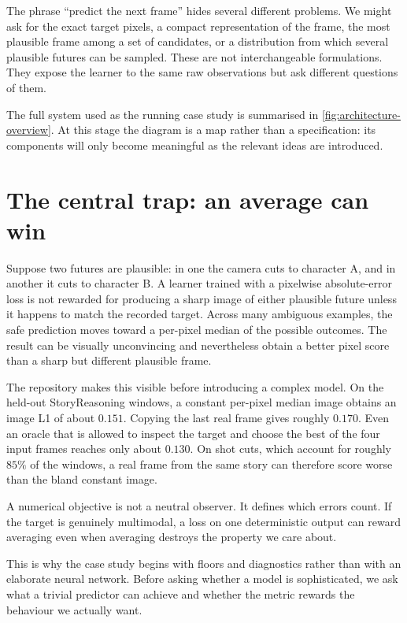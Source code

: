 The phrase ``predict the next frame'' hides several different problems. We might ask for the exact target pixels, a compact representation of the frame, the most plausible frame among a set of candidates, or a distribution from which several plausible futures can be sampled. These are not interchangeable formulations. They expose the learner to the same raw observations but ask different questions of them.

The full system used as the running case study is summarised in \cref{fig:architecture-overview}. At this stage the diagram is a map rather than a specification: its components will only become meaningful as the relevant ideas are introduced.

\section{The central trap: an average can win}

Suppose two futures are plausible: in one the camera cuts to character A, and in another it cuts to character B. A learner trained with a pixelwise absolute-error loss is not rewarded for producing a sharp image of either plausible future unless it happens to match the recorded target. Across many ambiguous examples, the safe prediction moves toward a per-pixel median of the possible outcomes. The result can be visually unconvincing and nevertheless obtain a better pixel score than a sharp but different plausible frame.

The repository makes this visible before introducing a complex model. On the held-out StoryReasoning windows, a constant per-pixel median image obtains an image L1 of about \(0.151\). Copying the last real frame gives roughly \(0.170\). Even an oracle that is allowed to inspect the target and choose the best of the four input frames reaches only about \(0.130\). On shot cuts, which account for roughly \(85\%\) of the windows, a real frame from the same story can therefore score worse than the bland constant image.

\begin{keyidea}
A numerical objective is not a neutral observer. It defines which errors count. If the target is genuinely multimodal, a loss on one deterministic output can reward averaging even when averaging destroys the property we care about.
\end{keyidea}

This is why the case study begins with floors and diagnostics rather than with an elaborate neural network. Before asking whether a model is sophisticated, we ask what a trivial predictor can achieve and whether the metric rewards the behaviour we actually want.

